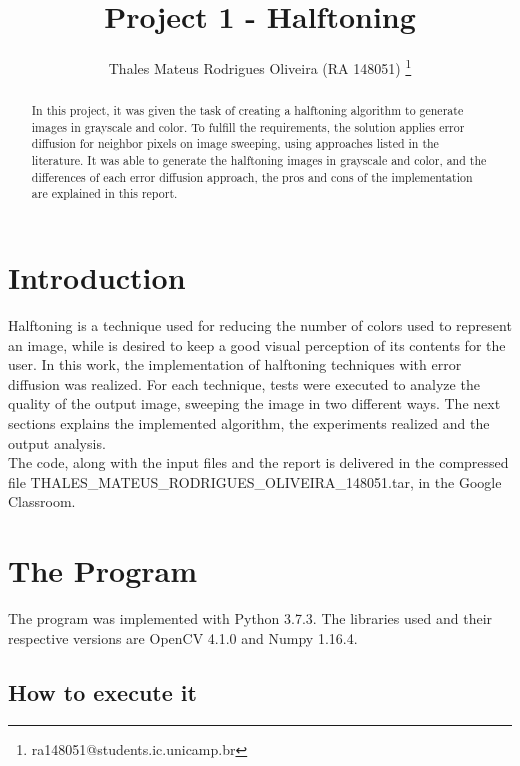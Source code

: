 \documentclass[]{IEEEtran}
\begin{document}
  \title{Project 1 - Halftoning}
  \author{Thales Mateus Rodrigues Oliveira (RA 148051)
    \thanks{ra148051@students.ic.unicamp.br}
  }
  \maketitle
  
  \begin{abstract}
    In this project, it was given the task of creating a halftoning algorithm to generate images in grayscale and color. To fulfill the requirements, the solution applies error diffusion for neighbor pixels on image sweeping, using approaches listed in the literature. It was able to generate the halftoning images in grayscale and color, and the differences of each error diffusion approach, the pros and cons of the implementation are explained in this report.
  \end{abstract}
  
\section{Introduction}
Halftoning is a technique used for reducing the number of colors used to represent an image, while is desired to keep a good visual perception of its contents for the user. In this work, the implementation of halftoning techniques with error diffusion was realized. For each technique, tests were executed to analyze the quality of the output image, sweeping the image in two different ways. The next sections explains the implemented algorithm, the experiments realized and the output analysis.
\\
The code, along with the input files and the report is delivered in the compressed file THALES\_MATEUS\_RODRIGUES\_OLIVEIRA\_148051.tar, in the Google Classroom.
\section{The Program}
 
The program was implemented with Python 3.7.3. The libraries used and their respective versions are OpenCV 4.1.0 and Numpy 1.16.4.

\subsection{How to execute it}
\end{document}
